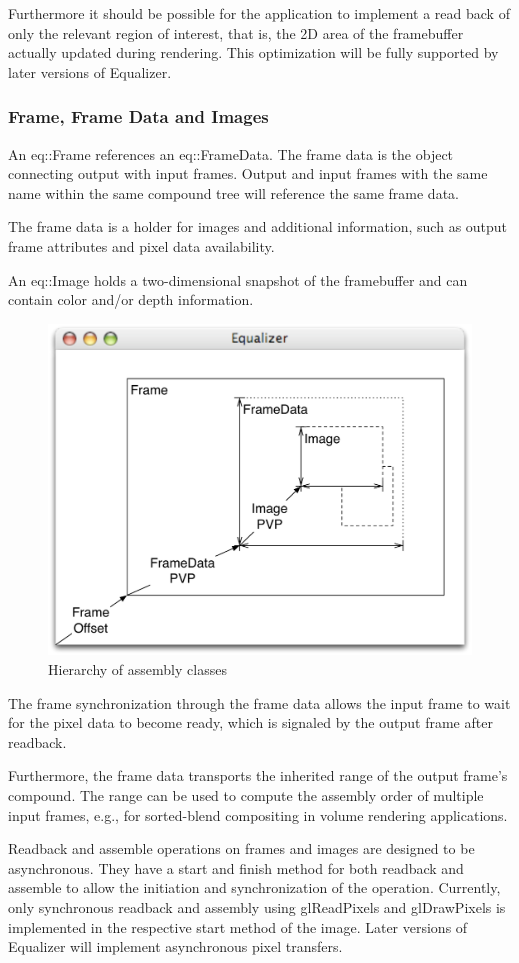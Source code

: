\documentclass[10pt,a4]{scrartcl}
\begin{document}
Furthermore it should be possible for the application to implement a
read back of only the relevant region of interest, that is, the 2D area
of the framebuffer actually updated during rendering. This optimization
will be fully supported by later versions of Equalizer.

\subsubsection{Frame, Frame Data and Images}

An \textsf{eq::Frame} references an \textsf{eq::Fra\-me\-Data}. The
frame data is the object connecting output with input frames. Output and
input frames with the same name within the same compound tree will
reference the same frame data.

The frame data is a holder for images and additional information, such
as output frame attributes and pixel data availability.

An \textsf{eq::Image} holds a
two-dimensional snapshot of the framebuffer and can contain color and/or
depth information.

\begin{figure}
  \includegraphics[width=.618\textwidth]{images/assembly.pdf}
  {\caption{\label{fAssembly}Hierarchy of assembly classes}}
\end{figure}
The frame synchronization through the frame data allows the input frame
to wait for the pixel data to become ready, which is signaled by the
output frame after readback.

Furthermore, the frame data transports the inherited range of the output
frame's compound. The range can be used to compute the assembly order of
multiple input frames, e.g., for sorted-blend compositing in volume
rendering applications.

Readback and assemble operations on frames and images are designed to be
asynchronous. They have a start and finish method for both readback and
assemble to allow the initiation and synchronization of the operation.
Currently, only synchronous readback and assembly using
\textsf{glReadPixels} and \textsf{glDrawPixels} is implemented in the
respective start method of the image. Later versions of Equalizer will
implement asynchronous pixel transfers.
\end{document}
